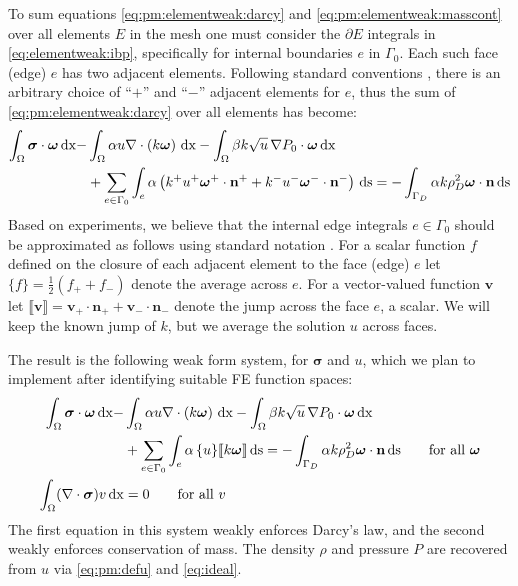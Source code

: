 \documentclass[11pt]{amsart}
\newcommand{\bn}{\mathbf{n}}
\newcommand{\bv}{\mathbf{v}}
\newcommand{\bsigma}{\bm{\sigma}}
\newcommand{\bomega}{\bm{\omega}}
\newcommand{\dx}{\mathrm{dx}}
\newcommand{\ds}{\mathrm{ds}}
\newcommand{\Div}{\nabla\cdot}
\newcommand{\grad}{\nabla}
\newcommand{\jump}[1]{\llbracket #1 \rrbracket }
\begin{document}
To sum equations \eqref{eq:pm:elementweak:darcy} and \eqref{eq:pm:elementweak:masscont} over all elements $E$ in the mesh one must consider the $\partial E$ integrals in \eqref{eq:elementweak:ibp}, specifically for internal boundaries $e$ in $\Gamma_0$.  Each such face (edge) $e$ has two adjacent elements.  Following standard conventions \citep{Arnold2002,Ham2023}, there is an arbitrary choice of ``$+$'' and ``$-$'' adjacent elements for $e$, thus the sum of \eqref{eq:pm:elementweak:darcy} over all elements has become:
\begin{align}
\int_\Omega \bsigma\cdot \bomega\,\dx - &\int_\Omega \alpha u \Div\left(k \bomega\right)\,\dx - \int_\Omega \beta k \sqrt{u}\,\grad P_0 \cdot \bomega\,\dx \label{eq:elementweak:darcy:second} \\
&+ \sum_{e\in\Gamma_0} \int_e \alpha \left(k^+ u^+ \bomega^+\cdot\bn^+ + k^- u^- \bomega^-\cdot\bn^-\right)\,\ds = - \int_{\Gamma_D} \alpha k \rho_D^2 \bomega\cdot\bn\,\ds \notag
\end{align}
Based on experiments, we believe that the internal edge integrals $e\in\Gamma_0$ should be approximated as follows using standard notation \citep{Arnold2002}.  For a scalar function $f$ defined on the closure of each adjacent element to the face (edge) $e$ let $\{f\} = \frac{1}{2} (f_+ + f_-)$ denote the average across $e$.  For a vector-valued function $\bv$ let $\jump{\bv} = \bv_+ \cdot \bn_+ + \bv_- \cdot \bn_-$ denote the jump across the face $e$, a scalar.  We will keep the known jump of $k$, but we average the solution $u$ across faces.

The result is the following weak form system, for $\bsigma$ and $u$, which we plan to implement after identifying suitable FE function spaces:
\begin{subequations}
\label{eq:weaku}
\begin{align}
\int_\Omega \bsigma\cdot \bomega\,\dx - &\int_\Omega \alpha u \Div\left(k \bomega\right)\,\dx - \int_\Omega \beta k \sqrt{u}\,\grad P_0 \cdot \bomega\,\dx \label{eq:weaku:darcy} \\
&+ \sum_{e\in\Gamma_0} \int_e \alpha\, \{u\} \jump{k\bomega}\,\ds = - \int_{\Gamma_D} \alpha k \rho_D^2 \bomega\cdot\bn\,\ds \qquad \text{for all } \bomega \notag \\
\int_\Omega (\Div \bsigma) v\,\dx &= 0 \qquad \text{for all } v  \label{eq:weaku:masscont}
\end{align}
\end{subequations}
The first equation in this system weakly enforces Darcy's law, and the second weakly enforces conservation of mass.  The density $\rho$ and pressure $P$ are recovered from $u$ via \eqref{eq:pm:defu} and \eqref{eq:ideal}.
\end{document}
